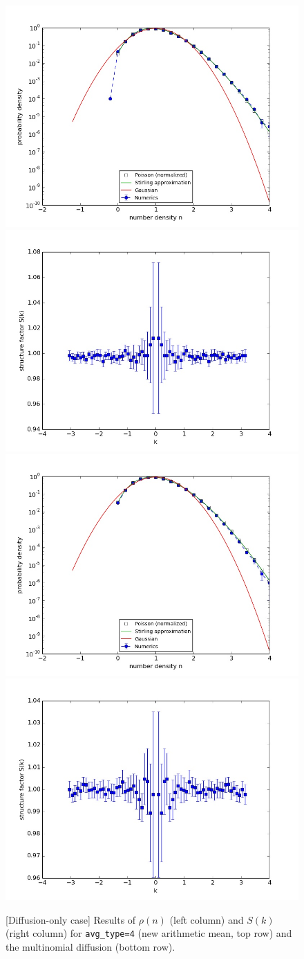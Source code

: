 \documentclass{article}
\begin{document}
\begin{figure}[ht!]
\includegraphics[width=0.5\linewidth]{fig1/diff_hist_avg4.jpg}
\includegraphics[width=0.5\linewidth]{fig1/diff_Sk_avg4.jpg}
\includegraphics[width=0.5\linewidth]{fig1/diff_hist_mn.jpg}
\includegraphics[width=0.5\linewidth]{fig1/diff_Sk_mn.jpg}
\caption{\label{fig_diff_45}[Diffusion-only case] Results of $\rho(n)$ (left column) and $S(k)$ (right column) for \texttt{avg\_type=4} (new arithmetic mean, top row) and the multinomial diffusion (bottom row).
}
\end{figure}
\end{document}
